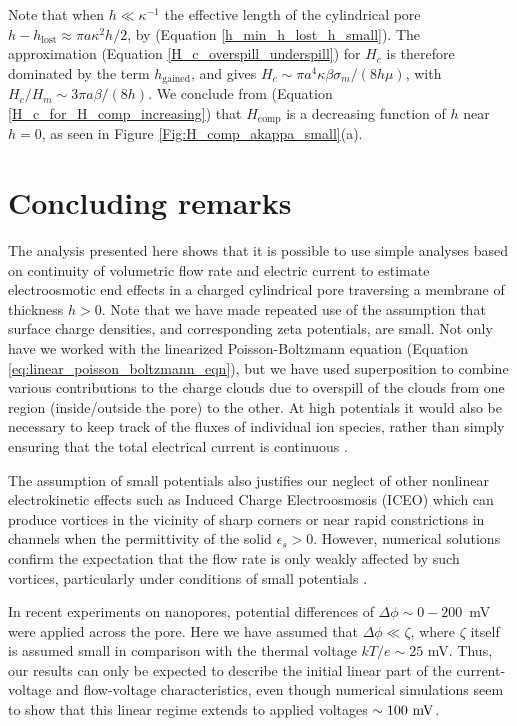 Note that when $h\ll\kappa^{-1}$ the effective length of the
cylindrical pore $h-h_\text{lost}\approx \pi a\kappa^2h/2$,
by (Equation \ref{h_min_h_lost_h_small}). The approximation
(Equation \ref{H_c_overspill_underspill}) for $H_c$
is therefore dominated by the term $h_\text{gained}$,
and gives $H_c\sim \pi a^4\kappa\beta\sigma_m/(8h\mu)$, with
$H_c/H_m\sim 3\pi a\beta/(8h)$. We conclude from
(Equation \ref{H_c_for_H_comp_increasing}) that $H_\text{comp}$
is a decreasing function of $h$ near $h=0$, as seen in 
Figure \ref{Fig:H_comp_akappa_small}(a).


\section{Concluding remarks}
The analysis presented here shows that it is possible to use simple
analyses based on continuity of volumetric flow rate and electric
current to estimate electroosmotic
end effects in a charged cylindrical pore traversing
a membrane of thickness $h>0$. Note that we have made repeated
use of the assumption that surface charge densities, and corresponding
zeta potentials, are small. Not only have we worked
with the linearized Poisson-Boltzmann equation
(Equation \ref{eq:linear_poisson_boltzmann_eqn}), but we have used superposition to
combine various contributions to the charge clouds due to
overspill of the clouds from one region (inside/outside the pore) to the other.
At high potentials it would also be necessary to keep track of the
fluxes of individual ion species, rather than simply ensuring
that the total electrical current is continuous \cite{biscombe2012}.

The assumption of small potentials also justifies our neglect of other 
nonlinear electrokinetic effects such as Induced Charge
Electroosmosis (ICEO) \cite{murtsovkin96, Squires2004} which can
produce vortices in the vicinity of sharp corners \cite{Thamida2002}
or near rapid constrictions in channels \cite{park2006eddies}
when the permittivity of the solid $\epsilon_s>0$.
However, numerical solutions confirm the expectation that the flow rate is only weakly affected by 
such vortices, particularly under conditions of small potentials \cite{Mao2013}.

In recent experiments
\cite{ghosal2013Nanoletter,Keyser2006,Garaj2010,Schneider2010,Merchant2010} 
on nanopores, potential differences of $\Delta\phi \sim 0 - 200$~mV
were applied across the pore.
Here we have assumed that $\Delta\phi\ll\zeta$, where 
$\zeta$ itself is assumed small in comparison with the thermal voltage $kT/e \sim 25$ mV.
 Thus, our results can only be expected to describe the initial linear part of the current-voltage 
 and flow-voltage characteristics, even though numerical simulations seem to show \cite{Mao2013}
 that this linear regime extends to applied voltages $\sim 100\rm\ mV$.


